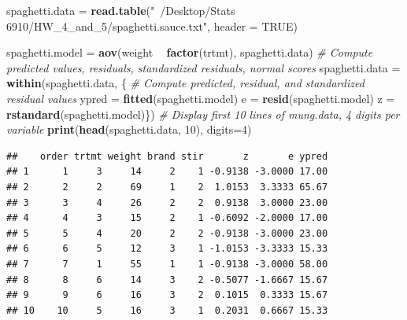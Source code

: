 \documentclass[12pt,]{article}
\newenvironment{Shaded}{\begin{snugshade}}{\end{snugshade}}
\newcommand{\KeywordTok}[1]{\textcolor[rgb]{0.13,0.29,0.53}{\textbf{#1}}}
\newcommand{\DataTypeTok}[1]{\textcolor[rgb]{0.13,0.29,0.53}{#1}}
\newcommand{\DecValTok}[1]{\textcolor[rgb]{0.00,0.00,0.81}{#1}}
\newcommand{\StringTok}[1]{\textcolor[rgb]{0.31,0.60,0.02}{#1}}
\newcommand{\CommentTok}[1]{\textcolor[rgb]{0.56,0.35,0.01}{\textit{#1}}}
\newcommand{\OtherTok}[1]{\textcolor[rgb]{0.56,0.35,0.01}{#1}}
\newcommand{\OperatorTok}[1]{\textcolor[rgb]{0.81,0.36,0.00}{\textbf{#1}}}
\newcommand{\NormalTok}[1]{#1}
\begin{document}
\begin{Shaded}
\begin{Highlighting}[]
\NormalTok{spaghetti.data =}\StringTok{ }\KeywordTok{read.table}\NormalTok{(}\StringTok{"~/Desktop/Stats 6910/HW_4_and_5/spaghetti.sauce.txt"}\NormalTok{, }\DataTypeTok{header =} \OtherTok{TRUE}\NormalTok{)}

\NormalTok{spaghetti.model =}\StringTok{ }\KeywordTok{aov}\NormalTok{(weight }\OperatorTok{~}\StringTok{ }\KeywordTok{factor}\NormalTok{(trtmt), spaghetti.data)}
\CommentTok{# Compute predicted values, residuals, standardized residuals, normal scores}
\NormalTok{spaghetti.data =}\StringTok{ }\KeywordTok{within}\NormalTok{(spaghetti.data, \{}
  \CommentTok{# Compute predicted, residual, and standardized residual values}
\NormalTok{  ypred =}\StringTok{ }\KeywordTok{fitted}\NormalTok{(spaghetti.model)}
\NormalTok{  e =}\StringTok{ }\KeywordTok{resid}\NormalTok{(spaghetti.model) }
\NormalTok{  z =}\StringTok{ }\KeywordTok{rstandard}\NormalTok{(spaghetti.model)\})}
\CommentTok{# Display first 10 lines of mung.data, 4 digits per variable}
\KeywordTok{print}\NormalTok{(}\KeywordTok{head}\NormalTok{(spaghetti.data, }\DecValTok{10}\NormalTok{), }\DataTypeTok{digits=}\DecValTok{4}\NormalTok{)}
\end{Highlighting}
\end{Shaded}

\begin{verbatim}
##    order trtmt weight brand stir       z       e ypred
## 1      1     3     14     2    1 -0.9138 -3.0000 17.00
## 2      2     2     69     1    2  1.0153  3.3333 65.67
## 3      3     4     26     2    2  0.9138  3.0000 23.00
## 4      4     3     15     2    1 -0.6092 -2.0000 17.00
## 5      5     4     20     2    2 -0.9138 -3.0000 23.00
## 6      6     5     12     3    1 -1.0153 -3.3333 15.33
## 7      7     1     55     1    1 -0.9138 -3.0000 58.00
## 8      8     6     14     3    2 -0.5077 -1.6667 15.67
## 9      9     6     16     3    2  0.1015  0.3333 15.67
## 10    10     5     16     3    1  0.2031  0.6667 15.33
\end{verbatim}
\end{document}
